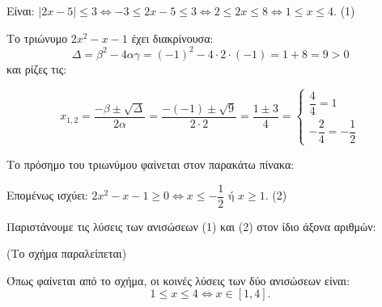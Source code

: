 
\begin{alist}
\item Είναι:
$|2x - 5| \le 3 \Leftrightarrow -3 \le 2x - 5 \le 3 \Leftrightarrow 2 \le 2x \le 8 \Leftrightarrow 1 \le x \le 4.$ (1)

\item Το τριώνυμο $2x^2 - x - 1$ έχει διακρίνουσα:
\[\Delta = \beta^2 - 4\alpha\gamma = (-1)^2 - 4 \cdot 2 \cdot (-1) = 1 + 8 = 9 > 0\]
και ρίζες τις:

\[x_{1,2} = \dfrac{-\beta \pm \sqrt{\Delta}}{2\alpha} = \dfrac{-(-1) \pm \sqrt{9}}{2 \cdot 2} = \dfrac{1 \pm 3}{4} = \begin{cases} \dfrac{4}{4} = 1 \\ -\dfrac{2}{4} = -\dfrac{1}{2} \end{cases}\]

Το πρόσημο του τριωνύμου φαίνεται στον παρακάτω πίνακα:
\begin{center}
\end{center}
Επομένως ισχύει:
$2x^2 - x - 1 \ge 0 \Leftrightarrow x \le -\dfrac{1}{2} \text{ ή } x \ge 1.$ (2)

\item Παριστάνουμε τις λύσεις των ανισώσεων (1) και (2) στον ίδιο άξονα αριθμών:

(Το σχήμα παραλείπεται)

Όπως φαίνεται από το σχήμα, οι κοινές λύσεις των δύο ανισώσεων είναι:
\[1 \le x \le 4 \Leftrightarrow x \in [1, 4].\]
\end{alist}

